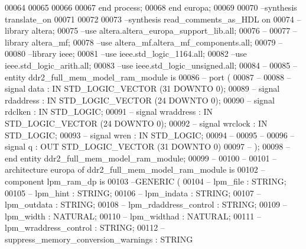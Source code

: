 \begin{DoxyCode}
00064       
00065 
00066 
00067     \textcolor{keywordflow}{end} \textcolor{keywordflow}{process};
00068 \textcolor{keywordflow}{end} \textcolor{vhdlchar}{europa};
00069 
00070 \textcolor{keyword}{--synthesis translate\_on}
00071 
00072 
00073 \textcolor{keyword}{--synthesis read\_comments\_as\_HDL on}
00074 \textcolor{keyword}{--library altera;}
00075 \textcolor{keyword}{--use altera.altera\_europa\_support\_lib.all;}
00076 \textcolor{keyword}{--}
00077 \textcolor{keyword}{--library altera\_mf;}
00078 \textcolor{keyword}{--use altera\_mf.altera\_mf\_components.all;}
00079 \textcolor{keyword}{--}
00080 \textcolor{keyword}{--library ieee;}
00081 \textcolor{keyword}{--use ieee.std\_logic\_1164.all;}
00082 \textcolor{keyword}{--use ieee.std\_logic\_arith.all;}
00083 \textcolor{keyword}{--use ieee.std\_logic\_unsigned.all;}
00084 \textcolor{keyword}{--}
00085 \textcolor{keyword}{--entity ddr2\_full\_mem\_model\_ram\_module is }
00086 \textcolor{keyword}{--        port (}
00087 \textcolor{keyword}{--              }
00088 \textcolor{keyword}{--                 signal data : IN STD\_LOGIC\_VECTOR (31 DOWNTO 0);}
00089 \textcolor{keyword}{--                 signal rdaddress : IN STD\_LOGIC\_VECTOR (24 DOWNTO 0);}
00090 \textcolor{keyword}{--                 signal rdclken : IN STD\_LOGIC;}
00091 \textcolor{keyword}{--                 signal wraddress : IN STD\_LOGIC\_VECTOR (24 DOWNTO 0);}
00092 \textcolor{keyword}{--                 signal wrclock : IN STD\_LOGIC;}
00093 \textcolor{keyword}{--                 signal wren : IN STD\_LOGIC;}
00094 \textcolor{keyword}{--}
00095 \textcolor{keyword}{--              }
00096 \textcolor{keyword}{--                 signal q : OUT STD\_LOGIC\_VECTOR (31 DOWNTO 0)}
00097 \textcolor{keyword}{--              );}
00098 \textcolor{keyword}{--end entity ddr2\_full\_mem\_model\_ram\_module;}
00099 \textcolor{keyword}{--}
00100 \textcolor{keyword}{--}
00101 \textcolor{keyword}{--architecture europa of ddr2\_full\_mem\_model\_ram\_module is}
00102 \textcolor{keyword}{--  component lpm\_ram\_dp is}
00103 \textcolor{keyword}{--GENERIC (}
00104 \textcolor{keyword}{--      lpm\_file : STRING;}
00105 \textcolor{keyword}{--        lpm\_hint : STRING;}
00106 \textcolor{keyword}{--        lpm\_indata : STRING;}
00107 \textcolor{keyword}{--        lpm\_outdata : STRING;}
00108 \textcolor{keyword}{--        lpm\_rdaddress\_control : STRING;}
00109 \textcolor{keyword}{--        lpm\_width : NATURAL;}
00110 \textcolor{keyword}{--        lpm\_widthad : NATURAL;}
00111 \textcolor{keyword}{--        lpm\_wraddress\_control : STRING;}
00112 \textcolor{keyword}{--        suppress\_memory\_conversion\_warnings : STRING}

\end{DoxyCode}
